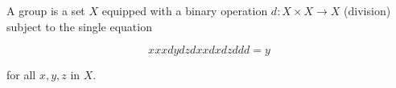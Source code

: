 A group is a set $X$ equipped with a binary operation $d: X \times X \longrightarrow X$ (division) subject to the single equation

$$xxxdydzdxxdxdzddd = y$$

for all $x, y, z$ in $X$.
